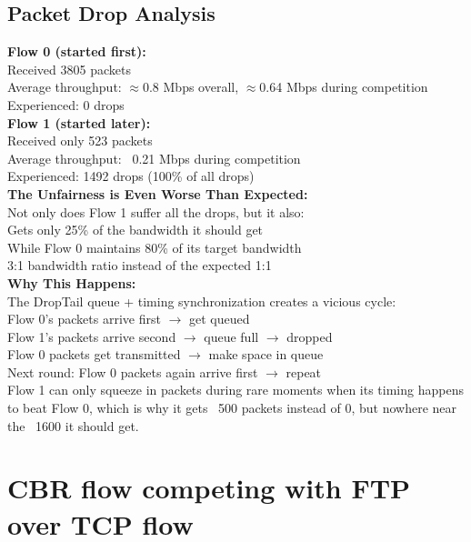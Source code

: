 \documentclass[12pt]{article}
\begin{document}
	\subsection{Packet Drop Analysis}
	
	\textbf{Flow 0 (started first):}	\\
	Received 3805 packets	\\
	Average throughput: $\approx$0.8 Mbps overall, $\approx$0.64 Mbps during competition	\\
	Experienced: 0 drops	\\
	
	\noindent
	\textbf{Flow 1 (started later):}	\\
	Received only 523 packets	\\
	Average throughput: ~0.21 Mbps during competition	\\
	Experienced: 1492 drops (100\% of all drops)	\\
	
	\noindent
	\textbf{The Unfairness is Even Worse Than Expected:}	\\
	Not only does Flow 1 suffer all the drops, but it also:	\\
	Gets only 25\% of the bandwidth it should get	\\
	While Flow 0 maintains 80\% of its target bandwidth	\\
	3:1 bandwidth ratio instead of the expected 1:1	\\
	
	\noindent
	\textbf{Why This Happens:}	\\
	The DropTail queue + timing synchronization creates a vicious cycle:	\\
	Flow 0's packets arrive first $\rightarrow$ get queued	\\
	Flow 1's packets arrive second $\rightarrow$ queue full $\rightarrow$ dropped	\\
	Flow 0 packets get transmitted $\rightarrow$ make space in queue	\\
	Next round: Flow 0 packets again arrive first $\rightarrow$ repeat	\\
	Flow 1 can only squeeze in packets during rare moments when its timing happens to beat Flow 0, which is why it gets ~500 packets instead of 0, but nowhere near the ~1600 it should get.
	
	
	\section{CBR flow competing with FTP over TCP flow}
	
\end{document}
